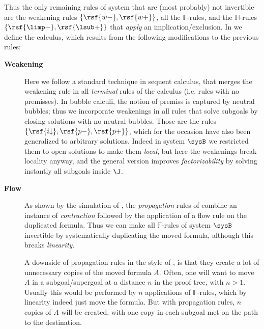 Thus the only remaining rules of system  that are (most probably) not
invertible are the weakening rules $\{\rsf{w{-}},\rsf{w{+}}\}$, all the
$\mathbb{F}$-rules, and the $\mathbb{H}$-rules $\{\rsf{{\limp}{-}},
\rsf{{\lsub}{+}}\}$ that \emph{apply} an implication/exclusion.
In  we define the  calculus, which results
from the following modifications to the previous rules:
\begin{description}
  \item[\textbf{Weakening}]
    Here we follow a standard technique in sequent calculus, that merges the
    weakening rule in all \emph{terminal} rules of the calculus (i.e. rules with
    no premisses). In bubble calculi, the notion of premiss is captured by
    neutral bubbles; thus we incorporate weakenings in all rules that solve
    subgoals by closing solutions with no neutral bubbles. Those are the rules
    $\{\rsf{i{\downarrow}},\rsf{p{-}},\rsf{p{+}}\}$, which for the occasion have
    also been generalized to arbitrary solutions. Indeed in system $\sysB$ we
    restricted them to open solutions to make them \emph{local}, but here the
    weakenings break locality anyway, and the general version improves
    \emph{factorizability} by solving instantly all subgoals inside $\J$.

  \item[\textbf{Flow}]
    As shown by the simulation of , the
    \emph{propagation} rules of  combine an instance of
    \emph{contraction} followed by the application of a flow rule on the
    duplicated formula. Thus we can make all $\mathbb{F}$-rules of system
    $\sysB$ invertible by systematically duplicating the moved formula, although
    this breaks \emph{linearity}.

    A downside of propagation rules in the style of , is that they
    create a lot of unnecessary copies of the moved formula $A$. Often, one will
    want to move $A$ in a subgoal/supergoal at a distance $n$ in the proof tree,
    with $n > 1$. Usually this would be performed by $n$ applications of
    $\mathbb{F}$-rules, which by linearity indeed just move the formula. But with
    propagation rules, $n$ copies of $A$ will be created, with one copy in each
    subgoal met on the path to the destination.


\end{description}
